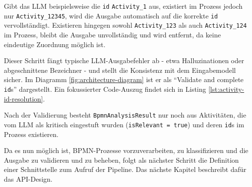 Gibt das \ac{LLM} beispielsweise die \texttt{id} \texttt{Activity\_1} aus, existiert im Prozess jedoch nur \texttt{Activity\_12345}, wird die Ausgabe automatisch auf die korrekte \texttt{id} vervollständigt. Existieren hingegen sowohl \texttt{Activity\_123} als auch \texttt{Activity\_124} im Prozess, bleibt die Ausgabe unvollständig und wird entfernt, da keine eindeutige Zuordnung möglich ist.

Dieser Schritt fängt typische \ac{LLM}-Ausgabefehler ab - etwa Halluzinationen oder abgeschnittene Bezeichner - und stellt die Konsistenz mit dem Eingabemodell sicher. Im Diagramm \ref{fig:architecture-diagram} ist er als \enquote{Validate and complete \texttt{id}s} dargestellt. Ein fokussierter Code-Auszug findet sich in Listing \ref{lst:activity-id-resolution}.

Nach der Validierung besteht \texttt{BpmnAnalysisResult} nur noch aus Aktivitäten, die vom \ac{LLM} als kritisch eingestuft wurden (\texttt{isRelevant = true}) und deren \texttt{id}s im Prozess existieren.

Da es nun möglich ist, \ac{BPMN}-Prozesse vorzuverarbeiten, zu klassifizieren und die Ausgabe zu validieren und zu beheben, folgt als nächster Schritt die Definition einer Schnittstelle zum Aufruf der Pipeline. Das nächste Kapitel beschreibt dafür das API-Design.